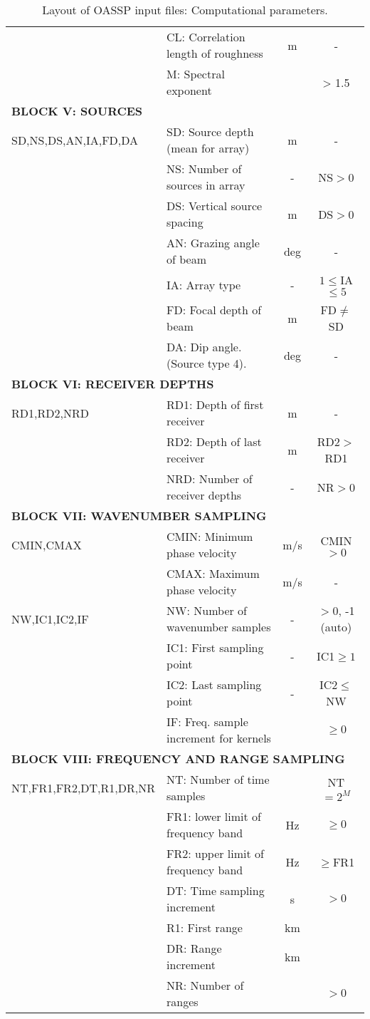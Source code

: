 \begin{table}
\begin{center}
\begin{tabular}{|l|l|c|c|}
	& CL: Correlation length of roughness & m & - \\
	& M:  Spectral exponent &   & > 1.5 \\
\hline
\multicolumn{4}{|l|}{\bf BLOCK V: SOURCES} \\
\hline
SD,NS,DS,AN,IA,FD,DA & SD: Source depth (mean for array) & m & - \\
	& NS: Number of sources in array & - &  NS$>0$ \\
	& DS: Vertical source spacing	& m & DS$>0$ \\
	& AN: Grazing angle of beam & deg & - \\
	& IA: Array type & - & $1 \leq $IA$\leq 5$ \\
	& FD: Focal depth of beam & m & FD$\neq$SD \\
        & DA: Dip angle. (Source type 4). & deg & - \\
\hline
\multicolumn{4}{|l|}{\bf BLOCK VI: RECEIVER DEPTHS} \\
\hline
RD1,RD2,NRD & RD1: Depth of first receiver & m & - \\
	& RD2: Depth of last receiver  & m & RD2$>$RD1 \\
	& NRD: Number of receiver depths & - & NR$>0$ \\
\hline
\multicolumn{4}{|l|}{\bf BLOCK VII: WAVENUMBER SAMPLING} \\
\hline
CMIN,CMAX & CMIN: Minimum phase velocity & m/s & CMIN$>0$ \\
	& CMAX: Maximum phase velocity & m/s & - \\
NW,IC1,IC2,IF & NW: Number of wavenumber samples & - & $>0$, -1 (auto) \\
	& IC1: First sampling point & - & IC1$\geq 1$ \\
	& IC2: Last sampling point & - & IC2$\leq$NW \\
        & IF: Freq. sample increment for kernels & & $\geq 0$ \\
\hline
\multicolumn{4}{|l|}{\bf BLOCK VIII: FREQUENCY AND RANGE  SAMPLING} \\
\hline
NT,FR1,FR2,DT,R1,DR,NR & NT: Number of time samples & & NT$=2^{M}$ \\
	& FR1: lower limit of frequency band & Hz & $\geq 0$ \\
	& FR2: upper limit of frequency band & Hz & $\geq$FR1 \\
        & DT: Time sampling increment & s & $> 0$ \\ 
        & R1: First range & km & \\
        & DR: Range increment & km & \\
	& NR: Number of ranges & & $> 0$ \\
\hline
\end{tabular}
\end{center}
\caption{Layout of OASSP input files: Computational parameters.
	\label{tab:oasspI} }
\end{table} 

